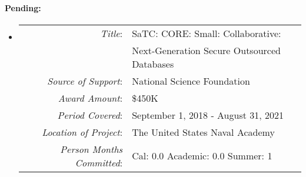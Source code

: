 \documentclass[10pt]{article}
\begin{document}
\paragraph{\bf Pending:}

\begin{itemize}
\item[]
  \begin{tabular} {r l}
    {\em Title}: & SaTC: CORE: Small: Collaborative: \\
     &  Next-Generation Secure Outsourced Databases \\
    {\em Source of Support}: & National Science Foundation \\
    {\em Award Amount}: & \$450K\\
    {\em Period Covered}: & September 1, 2018 - August 31, 2021\\
    {\em Location of Project}: & The United States Naval Academy \\
    {\em Person Months Committed}: & Cal: 0.0 Academic: 0.0 Summer: 1\\
 \end{tabular}

  

 


\end{itemize}
\end{document}
